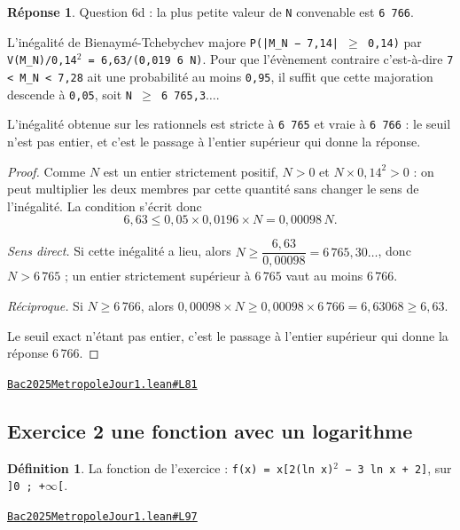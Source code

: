 \documentclass[11pt,a4paper]{article}
\theoremstyle{definition}
\newtheorem{definition}{Définition}
\theoremstyle{plain}
\theoremstyle{definition}
\newtheorem*{reponse}{Réponse}
\newcommand{\source}[2]{\par\smallskip\noindent\hfill{\footnotesize\href{#1}{\texttt{#2}}}\par\smallskip}
\begin{document}
\begin{reponse}
Question 6d : la plus petite valeur de \texttt{N} convenable est \texttt{6 766}.

L'inégalité de Bienaymé-Tchebychev majore \texttt{P(|M\_N − 7,14| \(\ge\) 0,14)} par
\texttt{V(M\_N)/0,14\(^{2}\) = 6,63/(0,019 6 N)}. Pour que l'évènement contraire \textemdash{} c'est-à-dire
\texttt{7 < M\_N < 7,28} \textemdash{} ait une probabilité au moins \texttt{0,95}, il suffit que cette majoration
descende à \texttt{0,05}, soit \texttt{N \(\ge\) 6 765,3\(\dots\)}.

L'inégalité obtenue sur les rationnels est stricte à \texttt{6 765} et vraie à \texttt{6 766} : le
seuil n'est pas entier, et c'est le passage à l'entier supérieur qui donne la
réponse.
\end{reponse}
\begin{proof}
Comme $N$ est un entier strictement positif, $N > 0$ et $N \times 0{,}14^2 > 0$ : on peut
multiplier les deux membres par cette quantité sans changer le sens de l'inégalité. La
condition s'écrit donc
\[ 6{,}63 \le 0{,}05 \times 0{,}0196 \times N = 0{,}00098\,N . \]

\emph{Sens direct.} Si cette inégalité a lieu, alors $N \ge \dfrac{6{,}63}{0{,}00098}
= 6\,765{,}30\ldots$, donc $N > 6\,765$ ; un entier strictement supérieur à $6\,765$ vaut
au moins $6\,766$.

\emph{Réciproque.} Si $N \ge 6\,766$, alors $0{,}00098 \times N \ge 0{,}00098 \times
6\,766 = 6{,}63068 \ge 6{,}63$.

Le seuil exact n'étant pas entier, c'est le passage à l'entier supérieur qui donne la
réponse $6\,766$.
\end{proof}
\source{https://github.com/Commutator-IO/learn-lean/blob/main/exams/2025/Bac2025MetropoleJour1.lean\#L81}{Bac2025MetropoleJour1.lean\#L81}

\subsection{Exercice 2 \textemdash{} une fonction avec un logarithme}

\begin{definition}
La fonction de l'exercice : \texttt{f(x) = x[2(ln x)\(^{2}\) − 3 ln x + 2]}, sur \texttt{]0 ; +\(\infty\)[}.
\end{definition}
\source{https://github.com/Commutator-IO/learn-lean/blob/main/exams/2025/Bac2025MetropoleJour1.lean\#L97}{Bac2025MetropoleJour1.lean\#L97}
\end{document}
